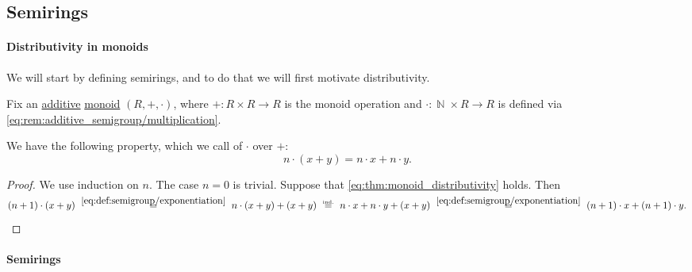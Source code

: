 \subsection{Semirings}\label{subsec:semirings}

\paragraph{Distributivity in monoids}

We will start by defining semirings, and to do that we will first motivate distributivity.

\begin{proposition}\label{thm:monoid_distributivity}
  Fix an \hyperref[rem:additive_semigroup/multiplication]{additive} \hyperref[def:monoid]{monoid} \( (R, +, \cdot) \), where \( +: R \times R \to R \) is the monoid operation and \( \cdot: \BbbN \times R \to R \) is defined via \eqref{eq:rem:additive_semigroup/multiplication}.

  We have the following property, which we call  of \( \cdot \) over \( + \):
  \begin{equation}\label{eq:thm:monoid_distributivity}
    n \cdot (x + y) = n \cdot x + n \cdot y.
  \end{equation}
\end{proposition}
\begin{proof}
  We use induction on \( n \). The case \( n = 0 \) is trivial. Suppose that \eqref{eq:thm:monoid_distributivity} holds. Then
  \begin{equation*}
    (n + 1) \cdot (x + y)
    \reloset {\eqref{eq:def:semigroup/exponentiation}} =
    n \cdot (x + y) + (x + y)
    \reloset {\T{ind.}} =
    n \cdot x + n \cdot y + (x + y)
    \reloset {\eqref{eq:def:semigroup/exponentiation}} =
    (n + 1) \cdot x + (n + 1) \cdot y.
  \end{equation*}
\end{proof}

\paragraph{Semirings}

